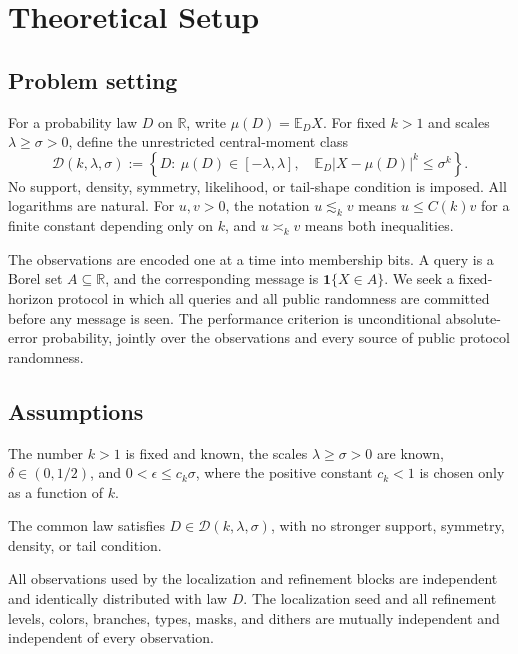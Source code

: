 \section{Theoretical Setup}

\subsection{Problem setting}

For a probability law $D$ on $\mathbb R$, write
$\mu(D)=\mathbb E_D X$.  For fixed $k>1$ and scales
$\lambda\geq\sigma>0$, define the unrestricted central-moment class
\[
  \mathcal D(k,\lambda,\sigma)
  :=\left\{D:\ \mu(D)\in[-\lambda,\lambda],\quad
  \mathbb E_D|X-\mu(D)|^k\leq\sigma^k\right\}.
\]
No support, density, symmetry, likelihood, or tail-shape condition is imposed.
All logarithms are natural.  For $u,v>0$, the notation $u\lesssim_k v$
means $u\leq C(k)v$ for a finite constant depending only on $k$, and
$u\asymp_kv$ means both inequalities.

The observations are encoded one at a time into membership bits.  A query is
a Borel set $A\subseteq\mathbb R$, and the corresponding message is
$\mathbf 1\{X\in A\}$.  We seek a fixed-horizon protocol in which all queries
and all public randomness are committed before any message is seen.  The
performance criterion is unconditional absolute-error probability, jointly
over the observations and every source of public protocol randomness.

\subsection{Assumptions}

\begin{assumption}\label{assump:parameter-domain}
The number $k>1$ is fixed and known, the scales $\lambda\geq\sigma>0$ are
known, $\delta\in(0,1/2)$, and $0<\epsilon\leq c_k\sigma$, where the positive
constant $c_k<1$ is chosen only as a function of $k$.
\end{assumption}

\begin{assumption}\label{assump:moment-class}
The common law satisfies $D\in\mathcal D(k,\lambda,\sigma)$, with no stronger
support, symmetry, density, or tail condition.
\end{assumption}

\begin{assumption}\label{assump:independent-samples}
All observations used by the localization and refinement blocks are independent
and identically distributed with law $D$.  The localization seed and all
refinement levels, colors, branches, types, masks, and dithers are mutually
independent and independent of every observation.
\end{assumption}

